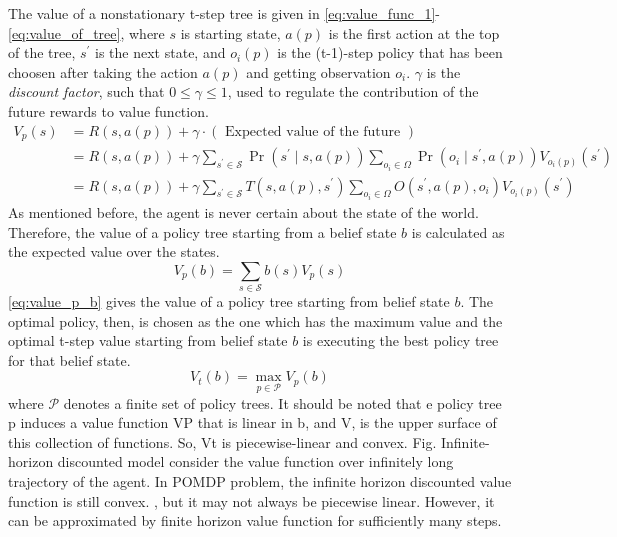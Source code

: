 The value of a nonstationary t-step tree is given in \autoref{eq:value_func_1}-\autoref{eq:value_of_tree}, where $ s $ is starting state, $ a(p) $ is the first action at the top of the tree, $ s^\prime $ is the next state, and $ o_{i}(p) $ is the (t-1)-step policy that has been choosen after taking the action $ a(p) $ and getting observation $ o_i $. $ \gamma $ is the \textit{discount factor}, such that $ 0\leq \gamma \leq 1 $, used to regulate the contribution of the future rewards to value function. \cite{Sutton2018}
\begin{align} 
V_{p}(s) &=R(s, a(p))+\gamma \cdot(\text { Expected value of the future }) \label{eq:value_func_1}\\
&=R(s, a(p))+\gamma \sum_{s^{\prime} \in \mathcal{S}} \operatorname{Pr}\left(s^{\prime} \mid s, a(p)\right) \sum_{o_{i} \in \Omega} \operatorname{Pr}\left(o_{i} \mid s^{\prime}, a(p)\right) V_{o_{i}(p)}\left(s^{\prime}\right) \label{eq:value_func_2}\\
&=R(s, a(p))+\gamma \sum_{s^{\prime} \in \mathcal{S}} T\left(s, a(p), s^{\prime}\right) \sum_{o_{i} \in \Omega} O\left(s^{\prime}, a(p), o_{i}\right) V_{o_{i}(p)}\left(s^{\prime}\right) 
\label{eq:value_of_tree}
\end{align}
As mentioned before, the agent is never certain about the state of the world. Therefore, the value of a policy tree starting from a belief state $ b $ is calculated as the expected value over the states.
\begin{equation}
V_{p}(b)=\sum_{s \in \mathcal{S}} b(s) V_{p}(s)
\label{eq:value_p_b}
\end{equation}
\autoref{eq:value_p_b} gives the value of a policy tree starting from belief state $ b $. The optimal policy, then, is chosen as the one which has the maximum value and the optimal t-step value starting from belief state $ b $ is executing the best policy tree for that belief state.
\begin{equation}
V_{t}(b)=\max _{p \in \mathcal{P}} V_p(b)
\end{equation}
where $ \mathcal{P} $ denotes a finite set of policy trees.
It should be noted that e policy tree p induces a value function VP that is linear in b, and V, is the upper surface of this collection of functions.
So, Vt is piecewise-linear and
convex. Fig.
Infinite-horizon discounted model consider the value function over infinitely long trajectory of the agent. In POMDP problem, the infinite horizon discounted value function is still convex. \cite{White1980}, but it may not always be piecewise linear. However, it can be approximated by finite horizon value function for sufficiently many steps. \cite{Sawaki1978, Edward2019}\\

